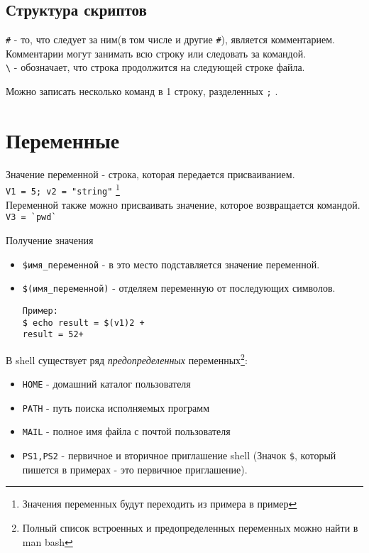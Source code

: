 \subsection{Структура скриптов}

\verb+#+ - то, что следует за ним(в том числе и другие \verb+#+), является комментарием. Комментарии могут занимать всю строку или следовать за командой.\\
\verb+\+ - обозначает, что строка продолжится на следующей строке файла.

Можно записать несколько команд в 1 строку, разделенных \verb+;+ \label{tz}.

\section{Переменные}

Значение переменной - строка, которая передается присваиванием.\\
\verb+V1 = 5; v2 = "string"+ \footnote{Значения переменных будут переходить из примера в пример}\\
Переменной также можно  присваивать значение, которое возвращается командой.\\
\verb+V3 = `pwd`+

\begin{center}
Получение значения
\end{center} 
\begin{itemize}
\item \verb+$имя_переменной+ - в это место подставляется значение переменной.
\item \verb+$(имя_переменной)+ -  отделяем переменную от последующих символов.
\begin{verbatim}
Пример: 
$ echo result = $(v1)2 +
result = 52+
\end{verbatim}
\end{itemize}

В shell существует ряд \emph{предопределенных} переменных\footnote{Полный список встроенных и предопределенных переменных можно найти в man bash}:
\begin{itemize}
	\item \verb+HOME+ - домашний каталог пользователя
	\item \verb+PATH+ - путь поиска исполняемых программ 
	\item \verb+MAIL+ - полное имя файла с почтой пользователя
	\item \verb+PS1,PS2+ - первичное и вторичное приглашение shell (Значок \verb+$+, который пишется в примерах - это первичное приглашение).
\end{itemize}

